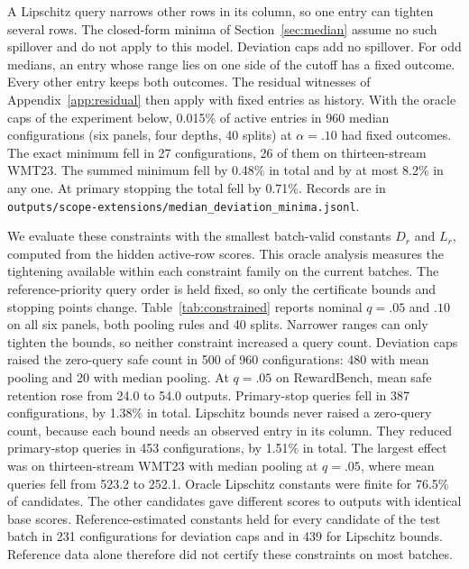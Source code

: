 A Lipschitz query narrows other rows in its column, so one entry can tighten several rows. The closed-form minima of Section~\ref{sec:median} assume no such spillover and do not apply to this model. Deviation caps add no spillover. For odd medians, an entry whose range lies on one side of the cutoff has a fixed outcome. Every other entry keeps both outcomes. The residual witnesses of Appendix~\ref{app:residual} then apply with fixed entries as history. With the oracle caps of the experiment below, 0.015\% of active entries in 960 median configurations (six panels, four depths, 40 splits) at $\alpha=.10$ had fixed outcomes. The exact minimum fell in 27 configurations, 26 of them on thirteen-stream WMT23. The summed minimum fell by 0.48\% in total and by at most 8.2\% in any one. At primary stopping the total fell by 0.71\%. Records are in \nolinkurl{outputs/scope-extensions/median_deviation_minima.jsonl}.

We evaluate these constraints with the smallest batch-valid constants $D_r$ and $L_r$, computed from the hidden active-row scores. This oracle analysis measures the tightening available within each constraint family on the current batches. The reference-priority query order is held fixed, so only the certificate bounds and stopping points change. Table~\ref{tab:constrained} reports nominal $q=.05$ and $.10$ on all six panels, both pooling rules and 40 splits. Narrower ranges can only tighten the bounds, so neither constraint increased a query count. Deviation caps raised the zero-query safe count in 500 of 960 configurations: 480 with mean pooling and 20 with median pooling. At $q=.05$ on RewardBench, mean safe retention rose from 24.0 to 54.0 outputs. Primary-stop queries fell in 387 configurations, by 1.38\% in total. Lipschitz bounds never raised a zero-query count, because each bound needs an observed entry in its column. They reduced primary-stop queries in 453 configurations, by 1.51\% in total. The largest effect was on thirteen-stream WMT23 with median pooling at $q=.05$, where mean queries fell from 523.2 to 252.1. Oracle Lipschitz constants were finite for 76.5\% of candidates. The other candidates gave different scores to outputs with identical base scores. Reference-estimated constants held for every candidate of the test batch in 231 configurations for deviation caps and in 439 for Lipschitz bounds. Reference data alone therefore did not certify these constraints on most batches.


